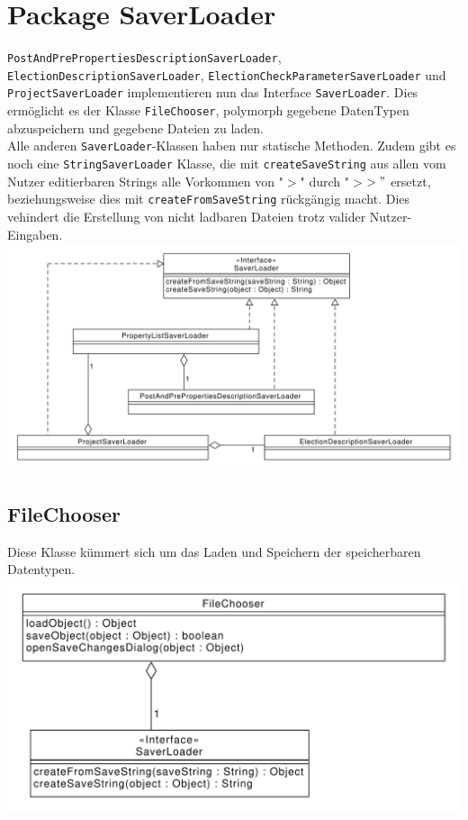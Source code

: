 \documentclass[a4paper]{scrreprt}
\begin{document}
\section{Package SaverLoader}
\verb!PostAndPrePropertiesDescriptionSaverLoader!, \verb!ElectionDescriptionSaverLoader!, \verb!ElectionCheckParameterSaverLoader! und \verb!ProjectSaverLoader! implementieren nun das Interface \verb!SaverLoader!. Dies ermöglicht es der Klasse \verb!FileChooser!, polymorph gegebene DatenTypen abzuspeichern und gegebene Dateien zu laden. \\
Alle anderen \verb!SaverLoader!-Klassen haben nur statische Methoden.
Zudem gibt es noch eine \verb!StringSaverLoader! Klasse, die mit \verb!createSaveString! aus allen vom Nutzer editierbaren Strings alle Vorkommen von "$>$"  durch "$>$$>"$ ersetzt, beziehungsweise dies mit \verb!createFromSaveString! rückgängig macht. Dies vehindert die Erstellung von nicht ladbaren Dateien trotz valider Nutzer-Eingaben.\\
\includegraphics[scale=0.5]{SaverLoader.pdf}

\subsection{FileChooser}
Diese Klasse kümmert sich um das Laden und Speichern der speicherbaren Datentypen.
\\
\includegraphics[scale=0.5]{FileChooser.pdf}
\end{document}
